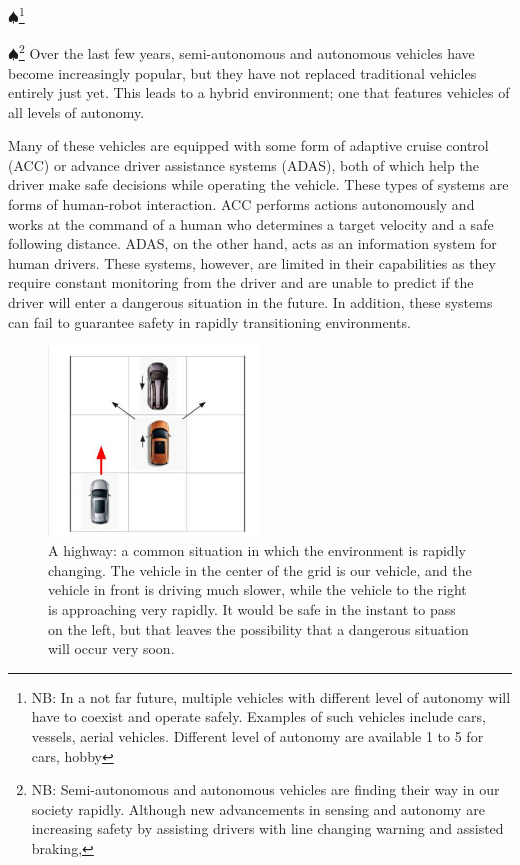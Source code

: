 \documentclass[conference]{IEEEtran}
\newcommand\NB[1]{$\spadesuit$\footnote{NB: #1}}
\begin{document}
\NB{In a not far future, multiple vehicles with different level of autonomy will have to coexist and operate safely. Examples of such vehicles include cars, vessels, aerial vehicles. Different level of autonomy are available 1 to 5 for cars, hobby  } 
    
\NB{Semi-autonomous and autonomous vehicles are finding their way in our society rapidly. Although new advancements in sensing and autonomy are increasing safety by assisting drivers with line changing warning and assisted braking, } Over the last few years, semi-autonomous and autonomous vehicles have become increasingly popular, but they have not replaced traditional vehicles entirely just yet. This leads to a hybrid environment; one that features vehicles of all levels of autonomy.
    
    Many of these vehicles are equipped with some form of adaptive cruise control (ACC) or advance driver assistance systems (ADAS), both of which help the driver make safe decisions while operating the vehicle. These types of systems are forms of human-robot interaction. ACC performs actions autonomously and works at the command of a human who determines a target velocity and a safe following distance. ADAS, on the other hand, acts as an information system for human drivers. These systems, however, are limited in their capabilities as they require constant monitoring from the driver and are unable to predict if the driver will enter a dangerous situation in the future. In addition, these systems can fail to guarantee safety in rapidly transitioning environments.
    

\begin{figure}[ht]
    \includegraphics[width=0.5\textwidth]{highwaysit.JPG}
    \caption{A highway: a common situation in which the environment is rapidly changing. The vehicle in the center of the grid is our vehicle, and the vehicle in front is driving much slower, while the vehicle to the right is approaching very rapidly. It would be safe in the instant to pass on the left, but that leaves the possibility that a dangerous situation will occur very soon.}
    \label{fig:hiway}
\end{figure}
    
\end{document}
